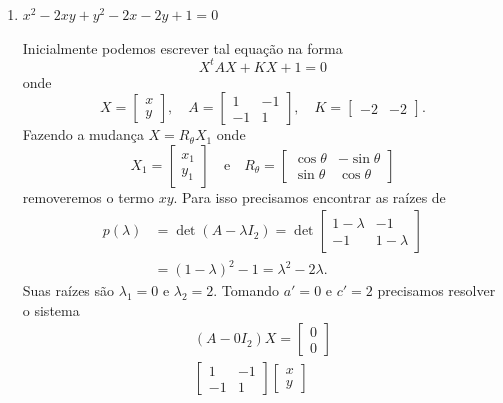 \begin{exemplos}
\begin{enumerate}
    \item $x^2 - 2xy + y^2 - 2x - 2y + 1 = 0$
    \begin{solucao}
      Inicialmente podemos escrever tal equação na forma
      \[
        X^t A X + KX + 1 = 0
      \]
      onde
      \[
        X = \begin{bmatrix}
          x\\y
        \end{bmatrix}, \quad A = \begin{bmatrix}
          1 & -1\\
          -1 & 1
        \end{bmatrix},\quad K = \begin{bmatrix}
          -2 & -2
        \end{bmatrix}.
      \]
      Fazendo a mudança $X = R_\theta X_1$ onde
      \[
        X_1 = \begin{bmatrix}
          x_1 \\y_1
        \end{bmatrix} \quad\mbox{e}\quad R_\theta = \begin{bmatrix}
          \cos\theta & -\sin\theta\\
          \sin\theta & \cos\theta
        \end{bmatrix}
      \]
      removeremos o termo $xy$. Para isso precisamos encontrar as raízes de
      \begin{align*}
        p(\lambda) &= \det (A - \lambda I_2) = \det \begin{bmatrix}
          1 - \lambda & -1\\
          -1 & 1 - \lambda
        \end{bmatrix} \\ &= (1 - \lambda)^2 - 1 = \lambda^2 - 2\lambda.
      \end{align*}
      Suas raízes são $\lambda_1 = 0$ e $\lambda_2 = 2$. Tomando $a' = 0$ e $c' = 2$ precisamos resolver o sistema
      \begin{align*}
        (A - 0I_2)X = \begin{bmatrix}
          0\\0
        \end{bmatrix}\\
        \begin{bmatrix}
          1 & -1\\
          -1 & 1
        \end{bmatrix} \begin{bmatrix}
          x \\y

\end{bmatrix}
\end{align*}
\end{solucao}
\end{enumerate}
\end{exemplos}
